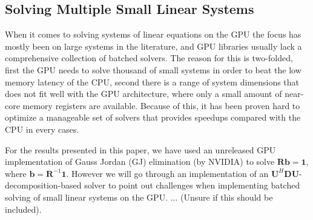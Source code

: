 \documentclass[journal]{IEEEtran}
\newcommand{\mat}[1]{\mathbf{#1}}
\renewcommand{\vec}[1]{\mathbf{#1}}
\begin{document}

\subsection{Solving Multiple Small Linear Systems}
When it comes to solving systems of linear equations on the GPU the focus has mostly been on large systems in the literature, and GPU libraries usually lack a comprehensive collection of batched solvers. The reason for this is two-folded, first the GPU needs to solve thousand of small systems in order to beat the low memory latency of the CPU, second there is a range of system dimensions that does not fit well with the GPU architecture, where only a small amount of near-core memory registers are available. Because of this, it has been proven hard to optimize a manageable set of solvers that provides speedups compared with the CPU in every cases.

For the results presented in this paper, we have used an unreleased GPU implementation of Gauss Jordan (GJ) elimination (by NVIDIA) to solve $\mat{R}\vec{b} = \vec{1}$, where $\vec{b} = \mat{R}^{-1}\vec{1}$. However we will go through an implementation of an $\mat{U}^H\mat{D}\mat{U}$-decomposition-based solver to point out challenges when implementing batched solving of small linear systems on the GPU. ... (Unsure if this should be included).
\end{document}
